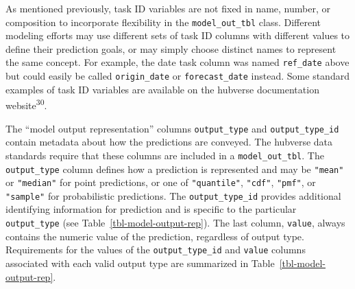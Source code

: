 \documentclass[
  letterpaper,
  DIV=11,
  numbers=noendperiod]{scrartcl}
\begin{document}
As mentioned previously, task ID variables are not fixed in name,
number, or composition to incorporate flexibility in the
\texttt{model\_out\_tbl} class. Different modeling efforts may use
different sets of task ID columns with different values to define their
prediction goals, or may simply choose distinct names to represent the
same concept. For example, the date task column was named
\texttt{ref\_date} above but could easily be called
\texttt{origin\_date} or \texttt{forecast\_date} instead. Some standard
examples of task ID variables are available on the hubverse
documentation website\textsuperscript{30}.

The ``model output representation'' columns \texttt{output\_type} and
\texttt{output\_type\_id} contain metadata about how the predictions are
conveyed. The hubverse data standards require that these columns are
included in a \texttt{model\_out\_tbl}. The \texttt{output\_type} column
defines how a prediction is represented and may be \texttt{"mean"} or
\texttt{"median"} for point predictions, or one of \texttt{"quantile"},
\texttt{"cdf"}, \texttt{"pmf"}, or \texttt{"sample"} for probabilistic
predictions. The \texttt{output\_type\_id} provides additional
identifying information for prediction and is specific to the particular
\texttt{output\_type} (see Table~\ref{tbl-model-output-rep}). The last
column, \texttt{value}, always contains the numeric value of the
prediction, regardless of output type. Requirements for the values of
the \texttt{output\_type\_id} and \texttt{value} columns associated with
each valid output type are summarized in
Table~\ref{tbl-model-output-rep}.
\end{document}
